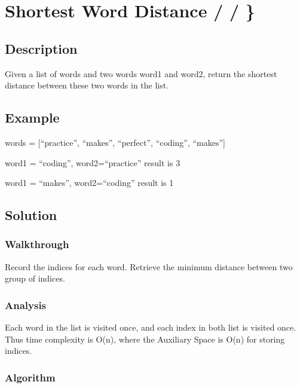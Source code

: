 \documentclass[]{book}
\begin{document}
\hypertarget{shortest-word-distance}{%
\section{Shortest Word Distance / / \}}\label{shortest-word-distance}}

\hypertarget{description-39}{%
\subsection{Description}\label{description-39}}

Given a list of words and two words word1 and word2, return the shortest distance between these two words in the list.

\hypertarget{example-38}{%
\subsection{Example}\label{example-38}}

words = {[}``practice'', ``makes'', ``perfect'', ``coding'', ``makes''{]}

word1 = ``coding'', word2=``practice'' result is 3

word1 = ``makes'', word2=``coding'' result is 1

\hypertarget{solution-31}{%
\subsection{Solution}\label{solution-31}}

\hypertarget{walkthrough-40}{%
\subsubsection{Walkthrough}\label{walkthrough-40}}

Record the indices for each word. Retrieve the minimum distance between two group of indices.

\hypertarget{analysis-43}{%
\subsubsection{Analysis}\label{analysis-43}}

Each word in the list is visited once, and each index in both list is visited once. Thus time complexity is O(n),
where the Auxiliary Space is O(n) for storing indices.

\hypertarget{algorithm-43}{%
\subsubsection{Algorithm}\label{algorithm-43}}
\end{document}
